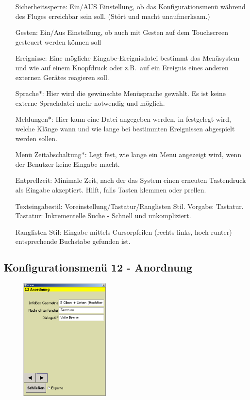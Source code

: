 \begin{enumerate}
\item[Sicherheitssperre:]  Ein/AUS
Einstellung, ob das Konfigurationsmenü während des Fluges  erreichbar sein soll. (Stört und macht unaufmerksam.)
\item[Gesten:] Ein/Aus
Einstellung, ob \xc auch mit Gesten auf dem Touchscreen gesteuert werden können soll
\item[Ereignisse:] Eine mögliche Eingabe-Ereignisdatei bestimmt das Menüsystem und wie \xc auf einem Knopfdruck oder z.B.\ auf ein Ereignis eines anderen externen Gerätes reagieren soll.
\item[Sprache$\ast$:] Hier wird die gewünschte Menüsprache gewählt. Es ist keine externe Sprachdatei mehr notwendig und möglich.
\item[Meldungen$\ast$:] Hier kann eine Datei angegeben werden, in festgelegt wird, welche Klänge wann und wie lange bei bestimmten Ereignissen abgespielt werden sollen.
\item[Menü Zeitabschaltung$\ast$:] Legt fest, wie lange ein Menü angezeigt wird, wenn der Benutzer keine Eingabe macht.
\item[Entprellzeit:]Minimale Zeit, nach der das System einen erneuten Tastendruck als Eingabe akzeptiert. Hilft, falls Tasten klemmen oder prellen.
\item[Texteingabestil:] Voreinstellung/Tastatur/Ranglisten Stil.
Vorgabe: Tastatur.\\
Tastatur: Inkrementelle Suche - Schnell und unkompliziert.

Ranglisten Stil: Eingabe mittels Cursorpfeilen (rechts-links, hoch-runter) entsprechende Buchstabe gefunden ist.
\end{enumerate}



\subsection{Konfigurationsmenü 12 - Anordnung}\label{Konfig12}
\begin{figure}
\includegraphics[width=4.5cm]{Bilder/Konfig12Anordnung.png}
\end{figure}

